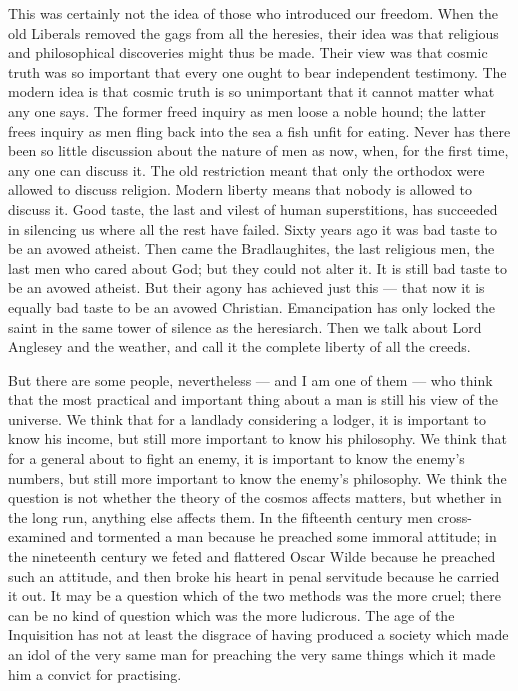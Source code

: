 This was certainly not the idea of those who introduced our freedom. When the old Liberals removed the gags from all the heresies, their idea was that religious and philosophical discoveries might thus be made. Their view was that cosmic truth was so important that every one ought to bear independent testimony. The modern idea is that cosmic truth is so unimportant that it cannot matter what any one says. The former freed inquiry as men loose a noble hound; the latter frees inquiry as men fling back into the sea a fish unfit for eating. Never has there been so little discussion about the nature of men as now, when, for the first time, any one can discuss it. The old restriction meant that only the orthodox were allowed to discuss religion. Modern liberty means that nobody is allowed to discuss it. Good taste, the last and vilest of human superstitions, has succeeded in silencing us where all the rest have failed. Sixty years ago it was bad taste to be an avowed atheist. Then came the Bradlaughites, the last religious men, the last men who cared about God; but they could not alter it. It is still bad taste to be an avowed atheist. But their agony has achieved just this — that now it is equally bad taste to be an avowed Christian. Emancipation has only locked the saint in the same tower of silence as the heresiarch. Then we talk about Lord Anglesey and the weather, and call it the complete liberty of all the creeds.

But there are some people, nevertheless — and I am one of them — who think that the most practical and important thing about a man is still his view of the universe. We think that for a landlady considering a lodger, it is important to know his income, but still more important to know his philosophy. We think that for a general about to fight an enemy, it is important to know the enemy’s numbers, but still more important to know the enemy’s philosophy. We think the question is not whether the theory of the cosmos affects matters, but whether in the long run, anything else affects them. In the fifteenth century men cross-examined and tormented a man because he preached some immoral attitude; in the nineteenth century we feted and flattered Oscar Wilde because he preached such an attitude, and then broke his heart in penal servitude because he carried it out. It may be a question which of the two methods was the more cruel; there can be no kind of question which was the more ludicrous. The age of the Inquisition has not at least the disgrace of having produced a society which made an idol of the very same man for preaching the very same things which it made him a convict for practising.


